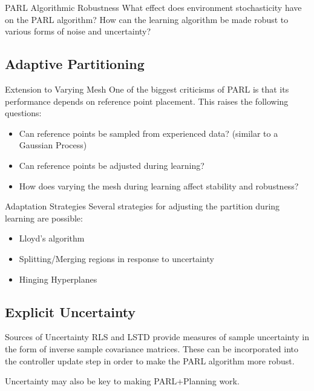 \documentclass{beamer}
\begin{document}
\begin{frame}{PARL Algorithmic Robustness}
  What effect does environment stochasticity have on the PARL algorithm? How
  can the learning algorithm be made robust to various forms of noise and
  uncertainty?
\end{frame}

\subsection{Adaptive Partitioning}

\begin{frame}{Extension to Varying Mesh}
  One of the biggest criticisms of PARL is that its performance depends on
  reference point placement. This raises the following questions:
  \begin{itemize}
    \item Can reference points be sampled from experienced data? (similar to a Gaussian Process)
    \item Can reference points be adjusted during learning?
    \item How does varying the mesh during learning affect stability and robustness?
  \end{itemize}
\end{frame}

\begin{frame}{Adaptation Strategies}
  Several strategies for adjusting the partition during learning are possible:
  \begin{itemize}
    \item Lloyd's algorithm
    \item Splitting/Merging regions in response to uncertainty
    \item Hinging Hyperplanes
  \end{itemize}
\end{frame}

\subsection{Explicit Uncertainty}

\begin{frame}{Sources of Uncertainty}
  RLS and LSTD provide measures of sample uncertainty in the form of inverse
  sample covariance matrices. These can be incorporated into the controller
  update step in order to make the PARL algorithm more robust. 

  Uncertainty may also be key to making PARL+Planning work.
\end{frame}
\end{document}
